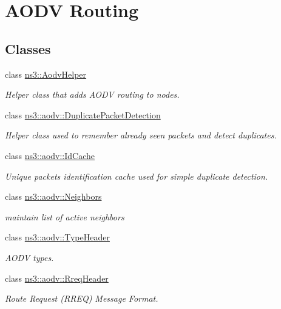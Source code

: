 \hypertarget{group__aodv}{}\section{A\+O\+DV Routing}
\label{group__aodv}
\subsection*{Classes}
\begin{DoxyCompactItemize}
\item 
class \hyperlink{classns3_1_1AodvHelper}{ns3\+::\+Aodv\+Helper}
\begin{DoxyCompactList}\small\item\em Helper class that adds A\+O\+DV routing to nodes. \end{DoxyCompactList}\item 
class \hyperlink{classns3_1_1aodv_1_1DuplicatePacketDetection}{ns3\+::aodv\+::\+Duplicate\+Packet\+Detection}
\begin{DoxyCompactList}\small\item\em Helper class used to remember already seen packets and detect duplicates. \end{DoxyCompactList}\item 
class \hyperlink{classns3_1_1aodv_1_1IdCache}{ns3\+::aodv\+::\+Id\+Cache}
\begin{DoxyCompactList}\small\item\em Unique packets identification cache used for simple duplicate detection. \end{DoxyCompactList}\item 
class \hyperlink{classns3_1_1aodv_1_1Neighbors}{ns3\+::aodv\+::\+Neighbors}
\begin{DoxyCompactList}\small\item\em maintain list of active neighbors \end{DoxyCompactList}\item 
class \hyperlink{classns3_1_1aodv_1_1TypeHeader}{ns3\+::aodv\+::\+Type\+Header}
\begin{DoxyCompactList}\small\item\em A\+O\+DV types. \end{DoxyCompactList}\item 
class \hyperlink{classns3_1_1aodv_1_1RreqHeader}{ns3\+::aodv\+::\+Rreq\+Header}
\begin{DoxyCompactList}\small\item\em Route Request (R\+R\+EQ) Message Format. \end{DoxyCompactList}\item 

\end{DoxyCompactItemize}
